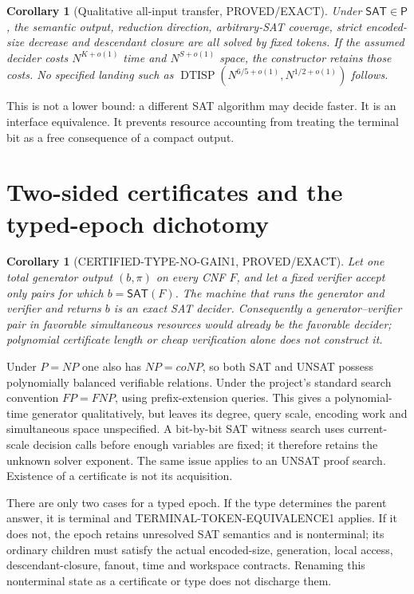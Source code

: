 \documentclass[11pt]{article}
\newtheorem{corollary}[theorem]{Corollary}
\newcommand{\SAT}{\mathsf{SAT}}
\begin{document}
\begin{corollary}[Qualitative all-input transfer, PROVED/EXACT]
Under $\SAT\in\mathsf P$, the semantic output, reduction direction,
arbitrary-SAT coverage, strict encoded-size decrease and descendant closure
are all solved by fixed tokens.  If the assumed decider costs
$N^{K+o(1)}$ time and $N^{S+o(1)}$ space, the constructor retains those
costs.  No specified landing such as
$\operatorname{DTISP}(N^{6/5+o(1)},N^{1/2+o(1)})$ follows.
\end{corollary}

This is not a lower bound: a different SAT algorithm may decide faster.  It
is an interface equivalence.  It prevents resource accounting from treating
the terminal bit as a free consequence of a compact output.

\section{Two-sided certificates and the typed-epoch dichotomy}

\begin{corollary}[CERTIFIED-TYPE-NO-GAIN1, PROVED/EXACT]
Let one total generator output $(b,\pi)$ on every CNF $F$, and let a fixed
verifier accept only pairs for which $b=\SAT(F)$.  The machine that runs the
generator and verifier and returns $b$ is an exact SAT decider.  Consequently
a generator--verifier pair in favorable simultaneous resources would already
be the favorable decider; polynomial certificate length or cheap
verification alone does not construct it.
\end{corollary}

Under $P=NP$ one also has $NP=coNP$, so both SAT and UNSAT possess
polynomially balanced verifiable relations.  Under the project's standard
search convention $FP=FNP$, using prefix-extension queries.  This gives a
polynomial-time generator qualitatively, but leaves its degree, query scale,
encoding work and simultaneous space unspecified.  A bit-by-bit SAT witness
search uses current-scale decision calls before enough variables are fixed;
it therefore retains the unknown solver exponent.  The same issue applies to
an UNSAT proof search.  Existence of a certificate is not its acquisition.

There are only two cases for a typed epoch.  If the type determines the
parent answer, it is terminal and TERMINAL-TOKEN-EQUIVALENCE1 applies.  If it
does not, the epoch retains unresolved SAT semantics and is nonterminal; its
ordinary children must satisfy the actual encoded-size, generation, local
access, descendant-closure, fanout, time and workspace contracts.  Renaming
this nonterminal state as a certificate or type does not discharge them.
\end{document}
